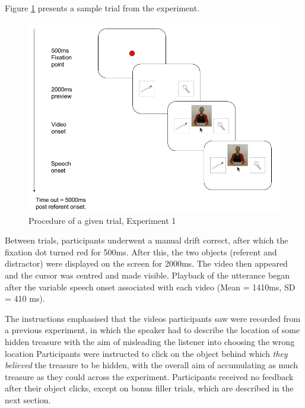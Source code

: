 \documentclass[a4paper,man,natbib]{apa6}
\begin{document}
Figure \ref{fig:v1_trial} presents a sample trial from the experiment. 
\begin{figure}[Ht]
  \centering
	\includegraphics[width=\linewidth]{./img/e7_trial.png}
  \caption{Procedure of a given trial, Experiment 1}
  \label{fig:v1_trial}
\end{figure}
Between trials, participants underwent a manual drift correct, after which the fixation dot turned red for 500ms. 
After this, the two objects (referent and distractor) were displayed on the screen for 2000ms.
The video then appeared and the cursor was centred and made visible.
Playback of the utterance began after the variable speech onset associated with each video (Mean = 1410ms, SD = 410 ms). 

The instructions emphasised that the videos participants saw were recorded from a previous experiment, in which the speaker had to describe the location of some hidden treasure with the aim of misleading the listener into choosing the wrong location %
Participants were instructed to click on the object behind which \textit{they believed} the treasure to be hidden, with the overall aim of accumulating as much treasure as they could across the experiment.
Participants received no feedback after their object clicks, except on bonus filler trials, which are described in the next section.

\end{document}
